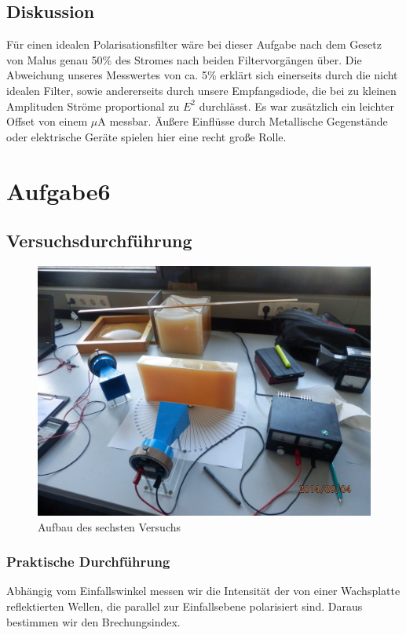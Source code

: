 \documentclass[12pt]{scrartcl}
\begin{document}
\subsection{Diskussion}
Für einen idealen Polarisationsfilter wäre bei dieser Aufgabe nach dem Gesetz von Malus genau 50\% des Stromes nach beiden Filtervorgängen über. Die Abweichung unseres Messwertes von ca. 5\% erklärt sich einerseits durch die nicht idealen Filter, sowie andererseits durch unsere Empfangsdiode, die bei zu kleinen Amplituden Ströme proportional zu $E^2$ durchlässt. Es war zusätzlich ein leichter Offset von einem $\mu$A messbar. Äußere Einflüsse durch Metallische Gegenstände oder elektrische Geräte spielen hier eine recht große Rolle.
\section{Aufgabe6}
\subsection{Versuchsdurchführung}
\begin{figure}[H] 
  \centering
    \includegraphics[scale = 0.1]{a_6.JPG}
  	\caption[Aufbau des sechsten Versuchs]{Aufbau des sechsten Versuchs}
  \label{fig:a_3}
\end{figure}
\subsubsection{Praktische Durchführung}
Abhängig vom Einfallswinkel messen wir die Intensität der von einer Wachsplatte reflektierten Wellen, die parallel zur Einfallsebene polarisiert sind. Daraus bestimmen wir den Brechungsindex.
\end{document}
